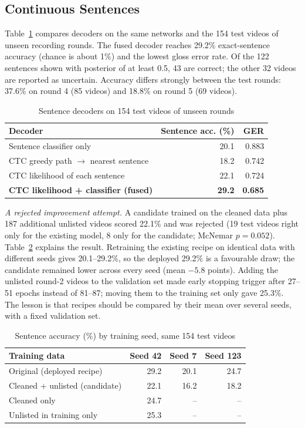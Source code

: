 \documentclass[conference]{IEEEtran}
\begin{document}
\subsection{Continuous Sentences}
Table~\ref{tab:sent} compares decoders on the same networks and the 154 test videos of unseen recording rounds. The fused decoder reaches 29.2\% exact-sentence accuracy (chance is about 1\%) and the lowest gloss error rate. Of the 122 sentences shown with posterior of at least 0.5, 43 are correct; the other 32 videos are reported as uncertain. Accuracy differs strongly between the test rounds: 37.6\% on round 4 (85 videos) and 18.8\% on round 5 (69 videos).

\begin{table}[t]
\caption{Sentence decoders on 154 test videos of unseen rounds}
\label{tab:sent}
\centering
\begin{tabular}{@{}lrr@{}}
\toprule
Decoder & Sentence acc. (\%) & GER \\
\midrule
Sentence classifier only & 20.1 & 0.883 \\
CTC greedy path $\rightarrow$ nearest sentence & 18.2 & 0.742 \\
CTC likelihood of each sentence & 22.1 & 0.724 \\
\textbf{CTC likelihood + classifier (fused)} & \textbf{29.2} & \textbf{0.685} \\
\bottomrule
\end{tabular}
\end{table}

\textit{A rejected improvement attempt.} A candidate trained on the cleaned data plus 187 additional unlisted videos scored 22.1\% and was rejected (19 test videos right only for the existing model, 8 only for the candidate; McNemar $p=0.052$). Table~\ref{tab:seeds} explains the result. Retraining the existing recipe on identical data with different seeds gives 20.1--29.2\%, so the deployed 29.2\% is a favourable draw; the candidate remained lower across every seed (mean $-5.8$ points). Adding the unlisted round-2 videos to the validation set made early stopping trigger after 27--51 epochs instead of 81--87; moving them to the training set only gave 25.3\%. The lesson is that recipes should be compared by their mean over several seeds, with a fixed validation set.

\begin{table}[t]
\caption{Sentence accuracy (\%) by training seed, same 154 test videos}
\label{tab:seeds}
\centering
\begin{tabular}{@{}lrrr@{}}
\toprule
Training data & Seed 42 & Seed 7 & Seed 123 \\
\midrule
Original (deployed recipe) & 29.2 & 20.1 & 24.7 \\
Cleaned + unlisted (candidate) & 22.1 & 16.2 & 18.2 \\
Cleaned only & 24.7 & -- & -- \\
Unlisted in training only & 25.3 & -- & -- \\
\bottomrule
\end{tabular}
\end{table}
\end{document}
